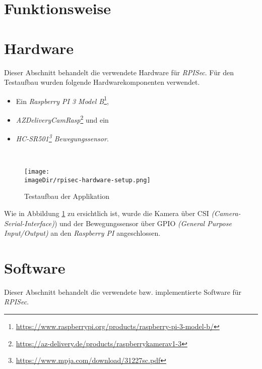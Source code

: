 \documentclass[]{article}
\newcommand{\imageDir}{images}
\begin{document}
\section{Funktionsweise}

\section{Hardware}
Dieser Abschnitt behandelt die verwendete Hardware für \emph{RPISec}. Für den Testaufbau wurden folgende Hardwarekomponenten verwendet.
\begin{itemize}
	\item Ein \emph{Raspberry PI 3 Model B}\footnote{\url{https://www.raspberrypi.org/products/raspberry-pi-3-model-b/}},
	\item \emph{AZDeliveryCamRasp}\footnote{\url{https://az-delivery.de/products/raspberrykamerav1-3}} und ein
	\item \emph{HC-SR501\footnote{\url{https://www.mpja.com/download/31227sc.pdf}} Bewegungssensor}.
\end{itemize}
\ \newpage

\begin{figure}[h]
	\centering
	\texttt{[image: \\imageDir/rpisec-hardware-setup.png]}
	\caption{Testaufbau der Applikation}
	\label{fig:image-hardware-setup}
\end{figure}
Wie in Abbildung \ref{fig:image-hardware-setup} zu ersichtlich ist, wurde die Kamera über CSI \emph{(Camera-Serial-Interface)}) und der Bewegungssensor über GPIO \emph{(General Purpose Input/Output)} an den \emph{Raspberry PI} angeschlossen.

\section{Software}
Dieser Abschnitt behandelt die verwendete bzw. implementierte Software für \emph{RPISec}.
\end{document}
